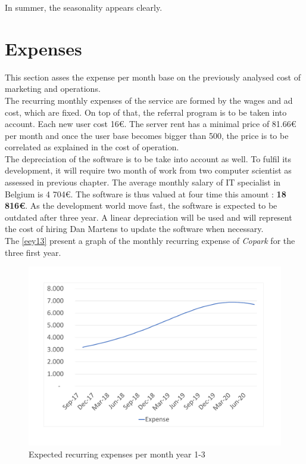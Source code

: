 \documentclass[12pt,a4paper,oneside]{book}
\newcommand{\bp}{\textit{Copark }}
\begin{document}
In summer, the seasonality appears clearly.

\section{Expenses}
\label{expenses}
This section asses the expense per month base on the previously analysed cost of marketing and operations.\\

The recurring monthly expenses of the service are formed by the wages and ad cost, which are fixed. On top of that, the referral program is to be taken into account. Each new user cost 16\euro{}. The server rent has a minimal price of 81.66\euro{} per month and once the user base becomes bigger than 500, the price is to be correlated as explained in the cost of operation.\\


The depreciation of the software is to be take into account as well. To fulfil its development, it will require two month of work from two computer scientist as assessed in previous chapter. The average monthly salary of IT specialist in Belgium is 4 704\euro{}.\cite{avslinf} The software is thus valued at four time this amount : \textbf{18 816\euro{}}. As the development world move fast, the software is expected to be outdated after three year. A linear depreciation will be used and will represent the cost of hiring Dan Martens to update the software when necessary.\\


The \autoref{eey13} present a graph of the monthly recurring expense of \bp for the three first year.

\begin{figure}[h]
\centering
\caption{Expected recurring expenses per month year 1-3}
\label{eey13}
\includegraphics[keepaspectratio=true,width=\textwidth-2cm]{../graph/expectedexp.pdf}
\end{figure}
\end{document}
